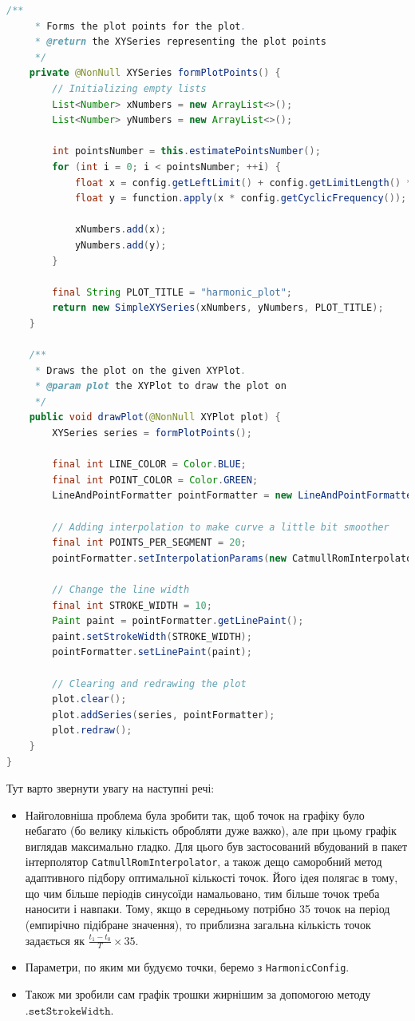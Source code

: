 \documentclass[oneside,solution]{android-assign}
\begin{document}
\begin{lstlisting}[language=java]
    /**
     * Forms the plot points for the plot.
     * @return the XYSeries representing the plot points
     */
    private @NonNull XYSeries formPlotPoints() {
        // Initializing empty lists
        List<Number> xNumbers = new ArrayList<>();
        List<Number> yNumbers = new ArrayList<>();

        int pointsNumber = this.estimatePointsNumber();
        for (int i = 0; i < pointsNumber; ++i) {
            float x = config.getLeftLimit() + config.getLimitLength() * i / pointsNumber;
            float y = function.apply(x * config.getCyclicFrequency());

            xNumbers.add(x);
            yNumbers.add(y);
        }

        final String PLOT_TITLE = "harmonic_plot";
        return new SimpleXYSeries(xNumbers, yNumbers, PLOT_TITLE);
    }

    /**
     * Draws the plot on the given XYPlot.
     * @param plot the XYPlot to draw the plot on
     */
    public void drawPlot(@NonNull XYPlot plot) {
        XYSeries series = formPlotPoints();

        final int LINE_COLOR = Color.BLUE;
        final int POINT_COLOR = Color.GREEN;
        LineAndPointFormatter pointFormatter = new LineAndPointFormatter(LINE_COLOR, POINT_COLOR, null, null);

        // Adding interpolation to make curve a little bit smoother
        final int POINTS_PER_SEGMENT = 20;
        pointFormatter.setInterpolationParams(new CatmullRomInterpolator.Params(POINTS_PER_SEGMENT, CatmullRomInterpolator.Type.Centripetal));

        // Change the line width
        final int STROKE_WIDTH = 10;
        Paint paint = pointFormatter.getLinePaint();
        paint.setStrokeWidth(STROKE_WIDTH);
        pointFormatter.setLinePaint(paint);

        // Clearing and redrawing the plot
        plot.clear();
        plot.addSeries(series, pointFormatter);
        plot.redraw();
    }
}
\end{lstlisting}

Тут варто звернути увагу на наступні речі:
\begin{itemize}
    \item Найголовніша проблема була зробити так, щоб точок на графіку було небагато (бо велику кількість обробляти дуже важко), але при цьому графік виглядав максимально гладко. Для цього був застосований вбудований в пакет інтерполятор \texttt{CatmullRomInterpolator}, а також дещо саморобний метод адаптивного підбору оптимальної кількості точок. Його ідея полягає в тому, що чим більше періодів синусоїди намальовано, тим більше точок треба наносити і навпаки. Тому, якщо в середньому потрібно 35 точок на період (емпирічно підібране значення), то приблизна загальна кількість точок задається як $\frac{t_1-t_0}{T} \times 35$.
    \item Параметри, по яким ми будуємо точки, беремо з \texttt{HarmonicConfig}.
    \item Також ми зробили сам графік трошки жирнішим за допомогою методу $\texttt{.setStrokeWidth}$.
\end{itemize}
\end{document}
